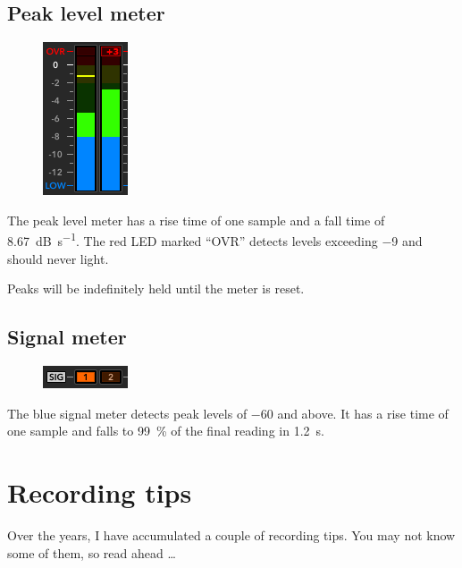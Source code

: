 \section{Peak level meter}

\begin{figure}
  \includegraphics[scale=0.625,clip]{include/images/level_meter_peak.png}
\end{figure}

The peak level meter has a rise time of one sample and a fall time of
\SI{8.67}{\dB\per\second}.  The red LED marked ``OVR'' detects levels
exceeding \SI{-9}{\dBFS} and should never light.

Peaks will be indefinitely held until the meter is reset.

\section{Signal meter}

\begin{figure}
  \includegraphics[scale=0.625,clip]{include/images/level_meter_signal.png}
\end{figure}

The blue signal meter detects peak levels of \SI{-60}{\dBFS} and
above.  It has a rise time of one sample and falls to
\SI{99}{\percent} of the final reading in \SI{1.2}{\second}.

\chapter{Recording tips}
\label{chap:recording_tips}

Over the years, I have accumulated a couple of recording tips.  You
may not know some of them, so read ahead \dots

